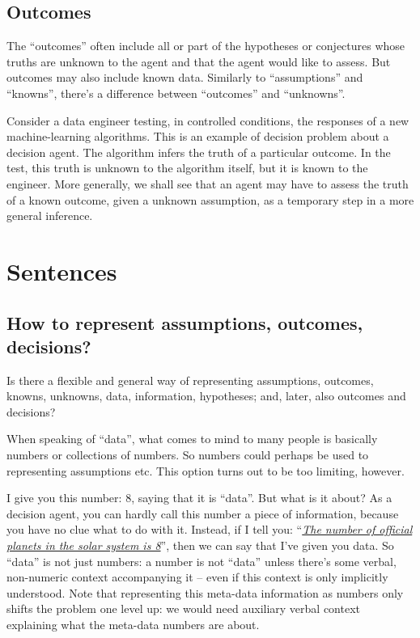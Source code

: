\documentclass[
  a4paper,
  DIV=11,
  numbers=noendperiod,
  oneside]{scrreprt}
\begin{document}
\hypertarget{outcomes}{%
\subsection{Outcomes}\label{outcomes}}

The ``outcomes'' often include all or part of the hypotheses or
conjectures whose truths are unknown to the agent and that the agent
would like to assess. But outcomes may also include known data.
Similarly to ``assumptions'' and ``knowns'', there's a difference
between ``outcomes'' and ``unknowns''.

Consider a data engineer testing, in controlled conditions, the
responses of a new machine-learning algorithms. This is an example of
decision problem about a decision agent. The algorithm infers the truth
of a particular outcome. In the test, this truth is unknown to the
algorithm itself, but it is known to the engineer. More generally, we
shall see that an agent may have to assess the truth of a known outcome,
given a unknown assumption, as a temporary step in a more general
inference.

\hypertarget{sentences}{%
\section{Sentences}\label{sentences}}

\hypertarget{how-to-represent-assumptions-outcomes-decisions}{%
\subsection{How to represent assumptions, outcomes,
decisions?}\label{how-to-represent-assumptions-outcomes-decisions}}

Is there a flexible and general way of representing assumptions,
outcomes, knowns, unknowns, data, information, hypotheses; and, later,
also outcomes and decisions?

When speaking of ``data'', what comes to mind to many people is
basically numbers or collections of numbers. So numbers could perhaps be
used to representing assumptions etc. This option turns out to be too
limiting, however.

I give you this number: {\(8\),} saying that it is ``data''. But what is
it about? As a decision agent, you can hardly call this number a piece
of information, because you have no clue what to do with it. Instead, if
I tell you:
``\emph{\href{https://solarsystem.nasa.gov/planets/overview}{The number
of official planets in the solar system is 8}}'', then we can say that
I've given you data. So ``data'' is not just numbers: a number is not
``data'' unless there's some verbal, non-numeric context accompanying it
-- even if this context is only implicitly understood. Note that
representing this meta-data information as numbers only shifts the
problem one level up: we would need auxiliary verbal context explaining
what the meta-data numbers are about.
\end{document}
